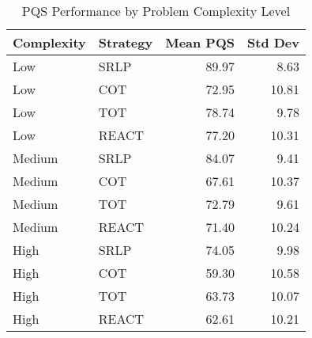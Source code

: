 \begin{table}[htbp]
\centering
\caption{PQS Performance by Problem Complexity Level}
\label{tab:pqs_by_complexity}
\begin{tabular}{llrr}
\toprule
Complexity & Strategy & Mean PQS & Std Dev \\
\midrule
Low & SRLP & 89.97 & 8.63 \\
Low & COT & 72.95 & 10.81 \\
Low & TOT & 78.74 & 9.78 \\
Low & REACT & 77.20 & 10.31 \\
Medium & SRLP & 84.07 & 9.41 \\
Medium & COT & 67.61 & 10.37 \\
Medium & TOT & 72.79 & 9.61 \\
Medium & REACT & 71.40 & 10.24 \\
High & SRLP & 74.05 & 9.98 \\
High & COT & 59.30 & 10.58 \\
High & TOT & 63.73 & 10.07 \\
High & REACT & 62.61 & 10.21 \\
\bottomrule
\end{tabular}
\end{table}